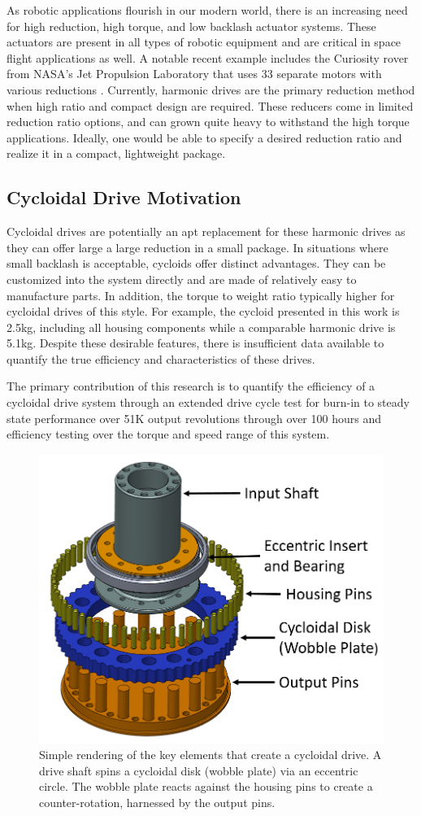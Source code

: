 As robotic applications flourish in our modern world, there is an increasing need for  high reduction, high torque, and low backlash actuator systems.
These actuators are present in all types of robotic equipment and are critical in space flight applications as well.
A notable recent example includes the Curiosity rover from NASA's Jet Propulsion Laboratory that uses 33 separate motors with various reductions \cite{curiosity}.
Currently, harmonic drives are the primary reduction method when high ratio and compact design are required.
These reducers come in limited reduction ratio options, and can grown quite heavy to withstand the high torque applications.
Ideally, one would be able to specify a desired reduction ratio and realize it in a compact, lightweight package.

\subsection{Cycloidal Drive Motivation}

Cycloidal drives are potentially an apt replacement for these harmonic drives as they can offer large a large reduction in a small package.
In situations where small backlash is acceptable, cycloids offer distinct advantages.
They can be customized into the system directly and are made of relatively easy to manufacture parts.
In addition, the torque to weight ratio typically higher for cycloidal drives of this style.
For example, the cycloid presented in this work is 2.5kg, including all housing components while a comparable harmonic drive is 5.1kg.
Despite these desirable features, there is insufficient data available to quantify the true efficiency and characteristics of these drives.

The primary contribution of this research is to quantify the efficiency of a cycloidal drive system through an extended drive cycle test for burn-in to steady state performance over 51K output revolutions through over 100 hours and efficiency testing over the torque and speed range of this system.

\begin{figure}[!b]
   \centering
   \includegraphics[width=0.50\linewidth]{images/cycloid_cartoon_v2}
   \caption{Simple rendering of the key elements that create a cycloidal drive.
   A drive shaft spins a cycloidal disk (wobble plate) via an eccentric circle.
   The wobble plate reacts against the housing pins to create a counter-rotation, harnessed by the output pins.}
   \label{cycloid_cartoon}
\end{figure}

